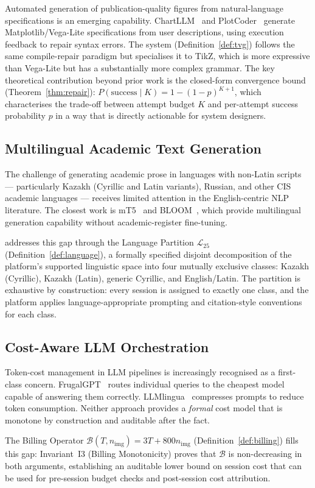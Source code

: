 Automated generation of publication-quality figures from natural-language specifications
is an emerging capability.
ChartLLM~\cite{wu2024chartllm} and PlotCoder~\cite{chen2021plotcoder} generate
Matplotlib/Vega-Lite specifications from user descriptions, using execution feedback
to repair syntax errors.
The \tvg{} system (Definition~\ref{def:tvg}) follows the same compile-repair paradigm
but specialises it to TikZ, which is more expressive than Vega-Lite but has a substantially
more complex grammar.
The key theoretical contribution beyond prior work is the closed-form convergence bound
(Theorem~\ref{thm:repair}): $P(\text{success}\mid K)=1-(1-p)^{K+1}$, which characterises
the trade-off between attempt budget $K$ and per-attempt success probability $p$ in a way
that is directly actionable for system designers.

\subsection{Multilingual Academic Text Generation}

The challenge of generating academic prose in languages with non-Latin scripts —
particularly Kazakh (Cyrillic and Latin variants), Russian, and other CIS academic languages
— receives limited attention in the English-centric NLP literature.
The closest work is mT5~\cite{xue2021mt5} and BLOOM~\cite{scao2022bloom}, which provide
multilingual generation capability without academic-register fine-tuning.

\sys{} addresses this gap through the Language Partition $\mathcal{L}_{25}$
(Definition~\ref{def:language}), a formally specified disjoint decomposition of the
platform's supported linguistic space into four mutually exclusive classes:
Kazakh (Cyrillic), Kazakh (Latin), generic Cyrillic, and English/Latin.
The partition is exhaustive by construction: every session is assigned to exactly one class,
and the platform applies language-appropriate prompting and citation-style conventions
for each class.

\subsection{Cost-Aware LLM Orchestration}

Token-cost management in LLM pipelines is increasingly recognised as a first-class concern.
FrugalGPT~\cite{chen2023frugalgpt} routes individual queries to the cheapest model capable
of answering them correctly.
LLMlingua~\cite{jiang2023llmlingua} compresses prompts to reduce token consumption.
Neither approach provides a \emph{formal} cost model that is monotone by construction
and auditable after the fact.

The Billing Operator $\mathcal{B}(T,n_{\text{img}})=3T+800n_{\text{img}}$
(Definition~\ref{def:billing}) fills this gap: Invariant~I3 (Billing Monotonicity) proves
that $\mathcal{B}$ is non-decreasing in both arguments, establishing an auditable lower
bound on session cost that can be used for pre-session budget checks and post-session
cost attribution.
